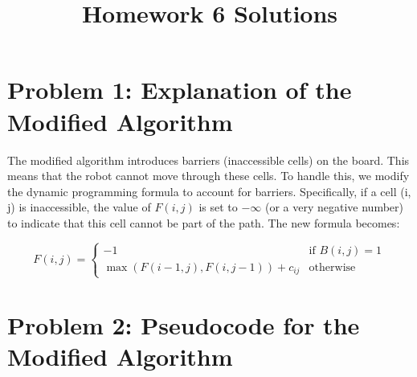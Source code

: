 \title{Homework 6 Solutions}
\author{}
\date{}



\maketitle

\section{Problem 1: Explanation of the Modified Algorithm}
The modified algorithm introduces barriers (inaccessible cells) on the board. This means that the robot cannot move through these cells. To handle this, we modify the dynamic programming formula to account for barriers. Specifically, if a cell (i, j) is inaccessible, the value of $F(i, j)$ is set to $-\infty$ (or a very negative number) to indicate that this cell cannot be part of the path. The new formula becomes:

\[
F(i, j) = 
\begin{cases} 
-1 & \text{if } B(i, j) = 1 \\
\max(F(i-1, j), F(i, j-1)) + c_{ij} & \text{otherwise}
\end{cases}
\]

\section{Problem 2: Pseudocode for the Modified Algorithm}
